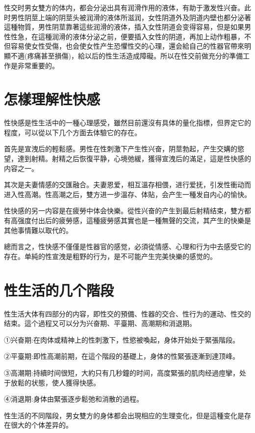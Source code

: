 \documentclass[12pt,UTF8]{ctexbook}
\begin{document}
性交时男女雙方的体内，都会分泌出具有润滑作用的液体，有助于激发性兴奋。此时男性阴莖上端的阴莖头被润滑的液体所滋润，女性阴道外及阴道内壁也都分泌著這種物質，男性阴莖靠著這些润滑的液体，插入女性阴道会变得容易，但是如果男性性急，在這種润滑的液体分泌之前，便要插入女性的阴道，再加上动作粗暴，不但容易使女性受傷，也会使女性产生恐懼性交的心理，還会給自己的性器官帶來明顯不適(疼痛甚至損傷)，給以后的性生活造成障礙。所以在性交前做充分的準備工作是非常重要的。

\section{怎樣理解性快感}

性快感是性生活中的一種心理感受，雖然目前還沒有具体的量化指標，但界定它的程度，可以從以下几个方面去体驗它的存在。

首先是宣洩后的輕鬆感。男性在性刺激下产生性兴奋，阴莖勃起，产生交媾的慾望，達到射精。射精之后恢復平静，心境弛緩，獲得宣洩后的滿足，這是性快感的内容之一。

其次是夫妻情感的交匯融合。夫妻恩爱，相互溫存相偎，进行爱抚，引发性衝动而进入性高潮。性高潮之后，雙方进一步溫存、体貼，会产生一種发自内心的愉快。

性快感的另一内容是在疲勞中体会快樂。從性兴奋的产生到最后射精结束，雙方都有高强度付出后的疲勞感，這種疲勞感其實也是一種無聲的交流，其产生的快樂是其他事情難以取代的。

總而言之，性快感不僅僅是性器官的感觉，必須從情感、心理和行为中去感受它的存在。单純的性宣洩是粗野的行为，是不可能产生完美快樂的感觉的。

\section{性生活的几个階段}

性生活大体有四部分的内容，即性交的預備、性器的交合、性行为的運动、性交的结束。這个過程又可以分为兴奋期、平臺期、高潮期和消退期。

①兴奋期:在肉体或精神上的性刺激下，性慾被喚起，身体开始处于緊張階段。

②平臺期:即性高潮前期，在這个階段的基礎上，身体的性緊張逐漸到達顶峰。

③高潮期:持續时间很短，大約只有几秒鐘的时间，高度緊張的肌肉经過痙攣，处于放鬆的状態，使人獲得快感。

④消退期:身体由緊張逐步鬆弛和消散的過程。

性生活的不同階段，男女雙方的身体都会出現相应的生理变化，但是這種变化是存在很大的个体差异的。
\end{document}

